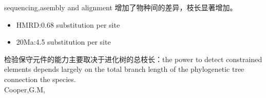 \documentclass{beamer}
\begin{document}
\begin{frame}{sequencing,asembly and alignment}
增加了物种间的差异，枝长显著增加。
\begin{itemize}
\item HMRD:0.68 substitution per site
\item 20Ma:4.5  substitution per site
\end{itemize}
检验保守元件的能力主要取决于进化树的总枝长：the power to detect constrained elements depends largely on the total branch length of the phylogenetic tree connection the species.\\
Cooper,G.M, {\color{red}{A quantitive estimates of sequence divergence for comparative analysis of mammaliang genomes}}
\end{frame}
\end{document}
